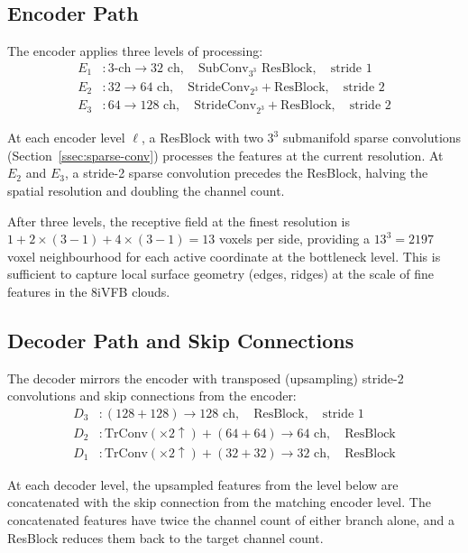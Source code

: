 \subsection{Encoder Path}

The encoder applies three levels of processing:
\begin{align*}
  E_1 &: \text{3-ch} \to 32\text{ ch},\quad \text{SubConv}_{3^3} \text{ ResBlock},\quad \text{stride }1 \\
  E_2 &: 32 \to 64\text{ ch},\quad \text{StrideConv}_{2^3} + \text{ResBlock},\quad \text{stride }2 \\
  E_3 &: 64 \to 128\text{ ch},\quad \text{StrideConv}_{2^3} + \text{ResBlock},\quad \text{stride }2
\end{align*}

At each encoder level $\ell$, a ResBlock with two $3^3$ submanifold sparse
convolutions (Section~\ref{ssec:sparse-conv}) processes the features at
the current resolution.
At $E_2$ and $E_3$, a stride-2 sparse convolution precedes the ResBlock,
halving the spatial resolution and doubling the channel count.

After three levels, the receptive field at the finest resolution is
$1 + 2 \times (3-1) + 4 \times (3-1) = 13$ voxels per side, providing
a $13^3 = 2197$ voxel neighbourhood for each active coordinate at the
bottleneck level.
This is sufficient to capture local surface geometry (edges, ridges) at the
scale of fine features in the 8iVFB clouds.

\subsection{Decoder Path and Skip Connections}

The decoder mirrors the encoder with transposed (upsampling) stride-2
convolutions and skip connections from the encoder:
\begin{align*}
  D_3 &: (128 + 128) \to 128\text{ ch},\quad \text{ResBlock},\quad \text{stride }1 \\
  D_2 &: \text{TrConv}(\times2\uparrow) + (64 + 64) \to 64\text{ ch},\quad \text{ResBlock} \\
  D_1 &: \text{TrConv}(\times2\uparrow) + (32 + 32) \to 32\text{ ch},\quad \text{ResBlock}
\end{align*}

At each decoder level, the upsampled features from the level below are
concatenated with the skip connection from the matching encoder level.
The concatenated features have twice the channel count of either branch alone,
and a ResBlock reduces them back to the target channel count.


